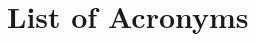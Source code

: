 \documentclass[11pt]{article} 	%
\begin{document}
	
	
	
	
	
	
	
	 

	\FloatBarrier
	\section*{List of Acronyms}\label{sec:ListOfAcronyms}
	\begin{multicols}{2}
		\printglossary[type=\acronymtype]
	\end{multicols}

	
	
\end{document}
